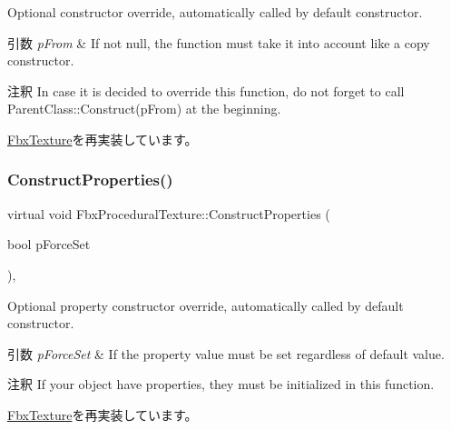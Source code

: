 Optional constructor override, automatically called by default constructor. 
\begin{DoxyParams}{引数}
{\em p\+From} & If not null, the function must take it into account like a copy constructor. \\
\hline
\end{DoxyParams}
\begin{DoxyRemark}{注釈}
In case it is decided to override this function, do not forget to call Parent\+Class\+::\+Construct(p\+From) at the beginning. 
\end{DoxyRemark}


\hyperlink{class_fbx_texture_afc81141345bc807a77dcbd9d6a0d8356}{Fbx\+Texture}を再実装しています。

\mbox{\label{class_fbx_procedural_texture_ae718dfc2092f735a1b6bcd724029a36c}} 
\subsubsection{\texorpdfstring{Construct\+Properties()}{ConstructProperties()}}
{\footnotesize\ttfamily virtual void Fbx\+Procedural\+Texture\+::\+Construct\+Properties (\begin{DoxyParamCaption}\item[{bool}]{p\+Force\+Set }\end{DoxyParamCaption})\hspace{0.3cm}{\ttfamily [protected]}, {\ttfamily [virtual]}}

Optional property constructor override, automatically called by default constructor. 
\begin{DoxyParams}{引数}
{\em p\+Force\+Set} & If the property value must be set regardless of default value. \\
\hline
\end{DoxyParams}
\begin{DoxyRemark}{注釈}
If your object have properties, they must be initialized in this function. 
\end{DoxyRemark}


\hyperlink{class_fbx_texture_a851d5c4c96fb5023c004c88aeab2275b}{Fbx\+Texture}を再実装しています。

\mbox{\label{class_fbx_procedural_texture_aab5e11d2e578c958cbe97f999379eeb4}} 
